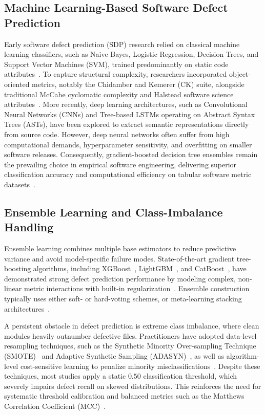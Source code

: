 \documentclass[conference]{IEEEtran}
\begin{document}
\subsection{Machine Learning-Based Software Defect Prediction}
Early software defect prediction (SDP) research relied on classical machine learning classifiers, such as Naive Bayes, Logistic Regression, Decision Trees, and Support Vector Machines (SVM), trained predominantly on static code attributes~\cite{ali2023featureselection}. To capture structural complexity, researchers incorporated object-oriented metrics, notably the Chidamber and Kemerer (CK) suite, alongside traditional McCabe cyclomatic complexity and Halstead software science attributes~\cite{haldar2024interpretable}. More recently, deep learning architectures, such as Convolutional Neural Networks (CNNs) and Tree-based LSTMs operating on Abstract Syntax Trees (ASTs), have been explored to extract semantic representations directly from source code. However, deep neural networks often suffer from high computational demands, hyperparameter sensitivity, and overfitting on smaller software releases. Consequently, gradient-boosted decision tree ensembles remain the prevailing choice in empirical software engineering, delivering superior classification accuracy and computational efficiency on tabular software metric datasets~\cite{ali2024ensemble, li2025modelaveraging}.



\subsection{Ensemble Learning and Class-Imbalance Handling}
Ensemble learning combines multiple base estimators to reduce predictive variance and avoid model-specific failure modes. State-of-the-art gradient tree-boosting algorithms, including XGBoost~\cite{chen2016xgboost}, LightGBM~\cite{ke2017lightgbm}, and CatBoost~\cite{prokhorenkova2018catboost}, have demonstrated strong defect prediction performance by modeling complex, non-linear metric interactions with built-in regularization~\cite{ali2024ensemble}. Ensemble construction typically uses either soft- or hard-voting schemes, or meta-learning stacking architectures~\cite{li2025modelaveraging}.

A persistent obstacle in defect prediction is extreme class imbalance, where clean modules heavily outnumber defective files. Practitioners have adopted data-level resampling techniques, such as the Synthetic Minority Over-sampling Technique (SMOTE)~\cite{chawla2002smote} and Adaptive Synthetic Sampling (ADASYN)~\cite{he2008adasyn}, as well as algorithm-level cost-sensitive learning to penalize minority misclassifications~\cite{tantithamthavorn2019optimization}. Despite these techniques, most studies apply a static $0.50$ classification threshold, which severely impairs defect recall on skewed distributions. This reinforces the need for systematic threshold calibration and balanced metrics such as the Matthews Correlation Coefficient (MCC)~\cite{chicco2020mcc}.
\end{document}
